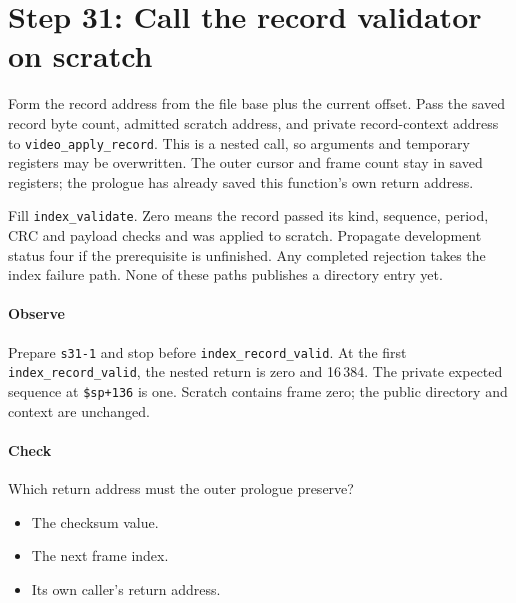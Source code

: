 \section{Step 31: Call the record validator on scratch}
Form the record address from the file base plus the current offset. Pass
the saved record byte count, admitted scratch address, and private record-context
address to \texttt{video\_apply\_record}. This is a nested call, so arguments
and temporary registers may be overwritten. The outer cursor and frame count
stay in saved registers; the prologue has already saved this function's own
return address.

Fill \texttt{index\_validate}. Zero means the record passed its kind, sequence,
period, CRC and payload checks and was applied to scratch. Propagate development
status four if the prerequisite is unfinished. Any completed rejection takes the
index failure path. None of these paths publishes a directory entry yet.

\paragraph{Observe} Prepare \texttt{s31-1} and stop before
\texttt{index\_record\_valid}. At the first \texttt{index\_record\_valid}, the nested return
is zero and 16\,384. The private expected sequence at \texttt{\$sp+136} is
one. Scratch contains frame zero; the public directory and context are unchanged.

\paragraph{Check} Which return address must the outer prologue preserve?
\begin{itemize}
\item[A.] The checksum value.
\item[B.] The next frame index.
\item[C.] Its own caller's return address.
\end{itemize}
